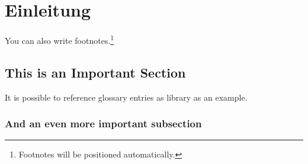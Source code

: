 \chapter{Einleitung}\label{ch:intro}

You can also write footnotes.\footnote{Footnotes will be positioned automatically.}


\section{This is an Important Section}

It is possible to reference glossary entries as \gls{library} as an example.


\subsection{And an even more important subsection}
